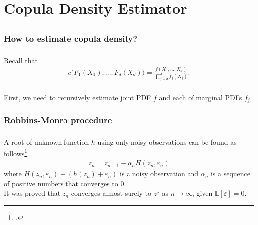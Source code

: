 \documentclass[aspectratio=169]{beamer}
\begin{document}
\section{Copula Density Estimator}
	\subsection{}
		\subsubsection{How to estimate copula density?}
			\begin{frame}
				\frametitle{\insertsubsubsection}
				
				Recall that
				\begin{align}
					c\big(F_1(X_1), \dots, F_d(X_d)\big) = \frac{f(X_1, \dots, X_d)}{\prod_{j=d}^{d}f_j(X_j)}.
				\end{align}
				\\[1em]
				First, we need to recursively estimate joint PDF $ f $ and each of marginal PDFs $ f_j $.
				
			\end{frame}
				
		\subsubsection{Robbins-Monro procedure}
			\begin{frame}
				\frametitle{\insertsubsubsection}
				
				 A root of unknown function $ h $ using only noisy observations can be found as follows\footcite{Robbins1951}
				\begin{align}
					z_n = z_{n-1} - \alpha_n H(z_n, \varepsilon_n)
				\end{align}
				where $ H(z_n, \varepsilon_n) \equiv (h(z_n) + \varepsilon_n) $ is a noisy observation and $ \alpha_n $ is a sequence of positive numbers that converges to 0. \\[1em]
				
				\onslide<2-> It was proved that $ z_n $ converges almost surely to $ z^\star $ as $ n\rightarrow \infty $, given $ \mathbb{E}[\varepsilon]=0 $.
				
			\end{frame}
		
\end{document}

